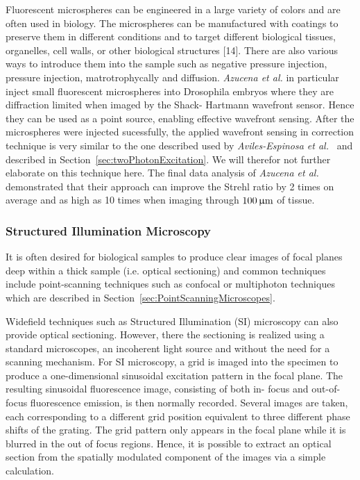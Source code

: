 Fluorescent microspheres can be engineered in a large variety of colors and are often used in biology. The microspheres can be manufactured with coatings to preserve them in different conditions and to target different biological tissues, organelles, cell walls, or other biological structures [14]. There are also various ways to introduce them into the sample such as negative pressure injection, pressure injection, matrotrophycally and diffusion. \emph{Azucena et al.} in particular inject small fluorescent microspheres into Drosophila embryos where they are diffraction limited when imaged by the Shack- Hartmann wavefront sensor. Hence they can be used as a point source, enabling effective wavefront sensing. After the microspheres were injected sucessfully, the applied wavefront sensing in correction technique is very similar to the one described used by \emph{Aviles-Espinosa et al.}~\cite{scan_TPFM_guide_start} and described in Section~\ref{sec:twoPhotonExcitation}. We will therefor not further elaborate on this technique here. The final data analysis of \emph{Azucena et al.}  demonstrated that their approach can improve the Strehl ratio by 2 times on average and as high as 10 times when imaging through $\unit[100]{\upmu m}$ of tissue.

\subsubsection{Structured Illumination Microscopy}
\label{sec:StructuredIlluminationMicroscopy}

It is often desired for biological samples to produce clear images of focal planes deep within a thick sample (i.e. optical sectioning) and common techniques include point-scanning techniques such as confocal or multiphoton techniques which are described in Section~\ref{sec:PointScanningMicroscopes}. 

Widefield techniques such as Structured Illumination (SI) microscopy can also provide optical sectioning. However, there the sectioning is realized using a standard microscopes, an incoherent light source and without the need for a scanning mechanism. For SI microscopy, a grid is imaged into the specimen to produce a one-dimensional sinusoidal excitation pattern in the focal plane. The resulting sinusoidal fluorescence image, consisting of both in- focus and out-of-focus fluorescence emission, is then normally recorded. Several images are taken, each corresponding to a different grid position equivalent to three different phase shifts of the grating. The grid pattern only appears in the focal plane while it is blurred in the out of focus regions. Hence, it is possible to extract an optical section from the spatially modulated component of the images via a simple calculation.

